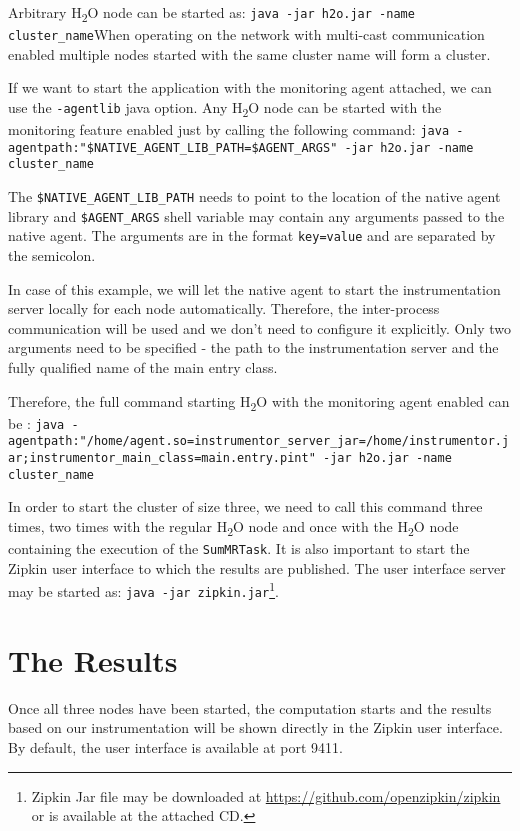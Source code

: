 Arbitrary H\textsubscript{2}O node can be started as: \newline \texttt{java -jar h2o.jar -name cluster\_name}\newline When operating on the network with multi-cast communication enabled multiple nodes started with the same cluster name will form a cluster.

If we want to start the application with the monitoring agent attached, we can use the \texttt{-agentlib} java option. Any H\textsubscript{2}O node can be started with the monitoring feature enabled just by calling the following command: \newline
\texttt{java -agentpath:"\$NATIVE\_AGENT\_LIB\_PATH=\$AGENT\_ARGS" -jar h2o.jar  \newline -name cluster\_name}

The \texttt{\$NATIVE\_AGENT\_LIB\_PATH} needs to point to the location of the native agent library and \texttt{\$AGENT\_ARGS} shell variable may contain any arguments passed to the native agent. The arguments are in the format \texttt{key=value} and are separated by the semicolon.

In case of this example, we will let the native agent to start the instrumentation server locally for each node automatically. Therefore, the inter-process communication will be used and we don't need to configure it explicitly. Only two arguments need to be specified - the path to the instrumentation server and the fully qualified name of the main entry class.

Therefore, the full command starting H\textsubscript{2}O with the monitoring agent enabled can be : \newline
\texttt{java -agentpath:"/home/agent.so=instrumentor\_server\_jar=\newline/home/instrumentor.jar;instrumentor\_main\_class=main.entry.pint" \newline-jar h2o.jar -name cluster\_name}

In order to start the cluster of size three, we need to call this command three times, two times with the regular H\textsubscript{2}O node and once with the H\textsubscript{2}O node containing the execution of the \texttt{SumMRTask}. It is also important to start the Zipkin user interface to which the results are published. The user interface server may be started as: \texttt{java -jar zipkin.jar}\footnote{Zipkin Jar file may be downloaded at \url{https://github.com/openzipkin/zipkin} or is available at the attached CD.}.
\section{The Results}
Once all three nodes have been started, the computation starts and the results based on our instrumentation will be shown directly in the Zipkin user interface. By default, the user interface is available at port 9411.

